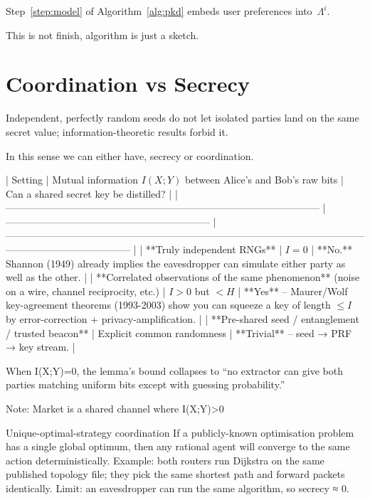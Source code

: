 Step~\ref{step:model} of Algorithm~\ref{alg:pkd}
embeds user preferences into~$\Lambda^{i}$.





This is not finish, algorithm is just a sketch. 



\section{Coordination vs Secrecy}

Independent, perfectly random seeds do not let isolated parties land on the same secret value; information-theoretic results forbid it.


In this sense we can either have, secrecy or coordination. 

| Setting                                                                                         | Mutual information $I(X;Y)$ between Alice’s and Bob’s raw bits | Can a shared secret key be distilled?                                                                                                              |
| ----------------------------------------------------------------------------------------------- | -------------------------------------------------------------- | -------------------------------------------------------------------------------------------------------------------------------------------------- |
| **Truly independent RNGs**                                                                      | $I=0$                                                          | **No.** Shannon (1949) already implies the eavesdropper can simulate either party as well as the other.                                            |
| **Correlated observations of the same phenomenon** (noise on a wire, channel reciprocity, etc.) | $I>0$ but $<H$                                                 | **Yes** – Maurer/Wolf key-agreement theorems (1993-2003) show you can squeeze a key of length $\le I$ by error-correction + privacy-amplification. |
| **Pre-shared seed / entanglement / trusted beacon**                                             | Explicit common randomness                                     | **Trivial** – seed → PRF → key stream.                                                                                                             |



When I(X;Y)=0, the lemma’s bound collapses to “no extractor can give both parties matching uniform bits except with guessing probability.”

Note: Market is a shared channel where I(X;Y)>0 

Unique-optimal-strategy coordination
If a publicly-known optimisation problem has a single global optimum, then any rational agent will converge to the same action deterministically.
Example: both routers run Dijkstra on the same published topology file; they pick the same shortest path and forward packets identically.
Limit: an eavesdropper can run the same algorithm, so secrecy ≈ 0.



